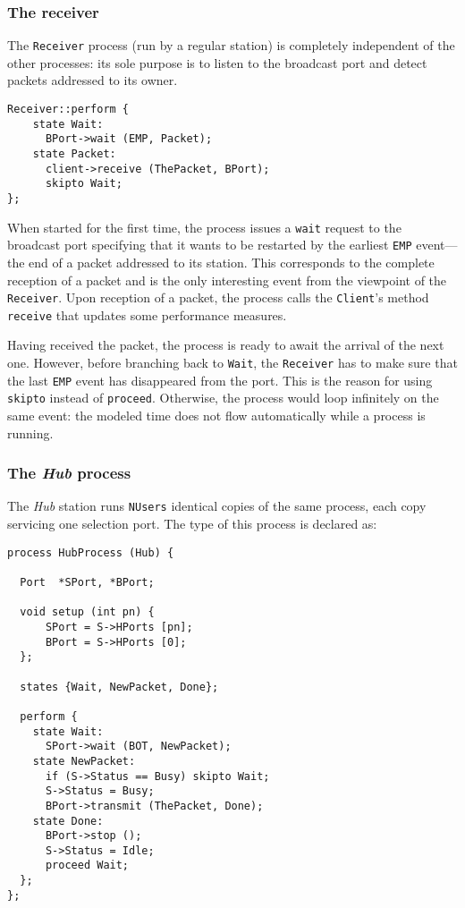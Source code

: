 \subsubsection{The receiver}

The {\tt Receiver} process (run by a regular station)
is completely independent of the other processes:
its sole purpose is to listen to the broadcast port and detect packets
addressed to its owner.
{\small
\begin{verbatim}
Receiver::perform {
    state Wait:
      BPort->wait (EMP, Packet);
    state Packet:
      client->receive (ThePacket, BPort);
      skipto Wait;
};
\end{verbatim} }

When started for the first time, the process
issues a {\tt wait} request to the broadcast port specifying that it wants
to be restarted by the earliest {\tt EMP} event---the end of a packet
addressed to its station.
This corresponds to the complete reception of a packet and is the only
interesting event from the viewpoint of the {\tt Receiver}.
Upon reception of a packet, the process calls the {\tt Client}'s method
{\tt receive} that updates some performance measures.

Having received the packet, the process is ready to await the arrival of the
next one.
However, before branching back to {\tt Wait}, the {\tt Receiver}
has to make sure
that the last {\tt EMP} event has disappeared from the port.
This is the reason for using {\tt skipto} instead of {\tt proceed}.
Otherwise, the process would loop infinitely on the same event:
the modeled time does not flow automatically
while a process is running.

\subsubsection{The {\em Hub\/} process}

The {\em Hub\/} station runs {\tt NUsers} identical copies of the same process,
each copy servicing one selection port.
The type of this process is declared as:
{\small
\begin{verbatim}
process HubProcess (Hub) {

  Port  *SPort, *BPort;

  void setup (int pn) {
      SPort = S->HPorts [pn];
      BPort = S->HPorts [0];
  };

  states {Wait, NewPacket, Done};

  perform {
    state Wait:
      SPort->wait (BOT, NewPacket);
    state NewPacket:
      if (S->Status == Busy) skipto Wait;
      S->Status = Busy;
      BPort->transmit (ThePacket, Done);
    state Done:
      BPort->stop ();
      S->Status = Idle;
      proceed Wait;
  };
};
\end{verbatim} }

